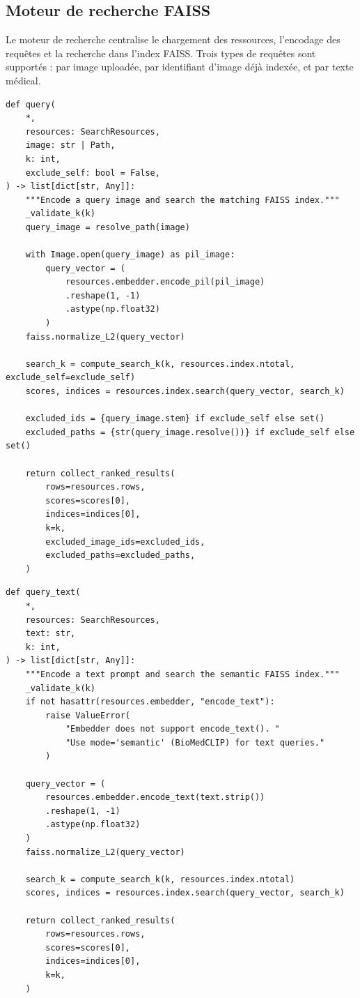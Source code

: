 \documentclass[12pt,a4paper]{article}
\begin{document}
\subsection{Moteur de recherche FAISS}

\noindent Le moteur de recherche centralise le chargement des ressources,
l'encodage des requêtes et la recherche dans l'index FAISS. Trois types de
requêtes sont supportés : par image uploadée, par identifiant d'image déjà
indexée, et par texte médical.

\begin{lstlisting}[style=mediscan, caption={Recherche par image uploadée (src/mediscan/search.py)}]
def query(
    *,
    resources: SearchResources,
    image: str | Path,
    k: int,
    exclude_self: bool = False,
) -> list[dict[str, Any]]:
    """Encode a query image and search the matching FAISS index."""
    _validate_k(k)
    query_image = resolve_path(image)

    with Image.open(query_image) as pil_image:
        query_vector = (
            resources.embedder.encode_pil(pil_image)
            .reshape(1, -1)
            .astype(np.float32)
        )
    faiss.normalize_L2(query_vector)

    search_k = compute_search_k(k, resources.index.ntotal, exclude_self=exclude_self)
    scores, indices = resources.index.search(query_vector, search_k)

    excluded_ids = {query_image.stem} if exclude_self else set()
    excluded_paths = {str(query_image.resolve())} if exclude_self else set()

    return collect_ranked_results(
        rows=resources.rows,
        scores=scores[0],
        indices=indices[0],
        k=k,
        excluded_image_ids=excluded_ids,
        excluded_paths=excluded_paths,
    )
\end{lstlisting}

\begin{lstlisting}[style=mediscan, caption={Recherche par texte médical (src/mediscan/search.py)}]
def query_text(
    *,
    resources: SearchResources,
    text: str,
    k: int,
) -> list[dict[str, Any]]:
    """Encode a text prompt and search the semantic FAISS index."""
    _validate_k(k)
    if not hasattr(resources.embedder, "encode_text"):
        raise ValueError(
            "Embedder does not support encode_text(). "
            "Use mode='semantic' (BioMedCLIP) for text queries."
        )

    query_vector = (
        resources.embedder.encode_text(text.strip())
        .reshape(1, -1)
        .astype(np.float32)
    )
    faiss.normalize_L2(query_vector)

    search_k = compute_search_k(k, resources.index.ntotal)
    scores, indices = resources.index.search(query_vector, search_k)

    return collect_ranked_results(
        rows=resources.rows,
        scores=scores[0],
        indices=indices[0],
        k=k,
    )
\end{lstlisting}
\end{document}
